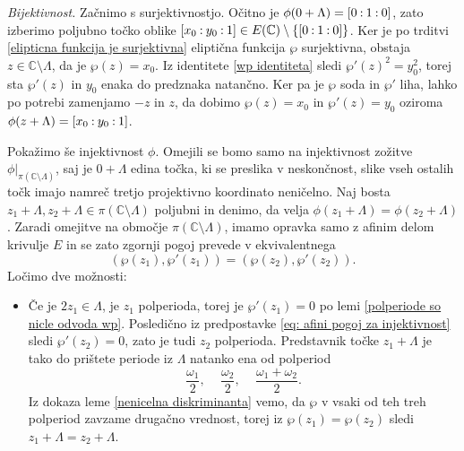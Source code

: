 \documentclass[mat1]{fmfdelo}
\numberwithin{equation}{section}
\newcommand{\C}{\mathbb C}
\newcommand{\oio}{\pcoor{0: 1 : 0}}
\newcommand{\om}{\omega}
\newcommand{\pcoor}[1]{%
\begingroup\lccode`~=`: \lowercase{\endgroup
\edef~}{\mathbin{\mathchar\the\mathcode`:}\nobreak}%
\left[%
\begingroup
\mathcode`:=\string"8000
#1%
\endgroup
\right]%
}
\theoremstyle{definition}
\begin{document}
\begin{dokaz}
    \emph{Bijektivnost.}
    Začnimo s surjektivnostjo. Očitno je $\phi(0 + \Lambda) = \oio$, zato izberimo poljubno točko oblike $\pcoor{x_0 : y_0 : 1} \in E(\C) \setminus \{\oio\}$. Ker je po trditvi \ref{elipticna funkcija je surjektivna} eliptična funkcija $\wp$ surjektivna, obstaja $z \in \C \setminus \Lambda$, da je $\wp(z) = x_0$. Iz identitete \eqref{wp identiteta} sledi $\wp'(z)^2 = y_0^2$, torej sta $\wp'(z)$ in $y_0$ enaka do predznaka natančno. Ker pa je $\wp$ soda in $\wp'$ liha, lahko po potrebi zamenjamo $-z$ in $z$, da dobimo $\wp(z) = x_0$ in $\wp'(z) = y_0$ oziroma $\phi(z + \Lambda) = \pcoor{x_0 : y_0 : 1}$.

    Pokažimo še injektivnost $\phi$. Omejili se bomo samo na injektivnost zožitve $\phi|_{\pi(\C\setminus\Lambda)}$, saj je $0 + \Lambda$ edina točka, ki se preslika v neskončnost, slike vseh ostalih točk imajo namreč tretjo projektivno koordinato neničelno. Naj bosta $z_1 + \Lambda, z_2 + \Lambda \in \pi(\C \setminus \Lambda)$ poljubni in denimo, da velja $\phi(z_1 + \Lambda) = \phi(z_2 + \Lambda)$. Zaradi omejitve na območje $\pi(\C \setminus \Lambda)$, imamo opravka samo z afinim delom krivulje $E$ in se zato zgornji pogoj prevede v ekvivalentnega 
    \begin{equation}
        \label{eq: afini pogoj za injektivnost}
        (\wp(z_1), \wp'(z_1)) = (\wp(z_2), \wp'(z_2)). 
    \end{equation}  
    Ločimo dve možnosti:
    \begin{itemize}
        \item
        Če je $2z_1 \in \Lambda$, je $z_1$ polperioda, torej je $\wp'(z_1) = 0$ po lemi \ref{polperiode so nicle odvoda wp}. Posledično iz predpostavke \eqref{eq: afini pogoj za injektivnost} sledi $\wp'(z_2) = 0$, zato je tudi $z_2$ polperioda. Predstavnik točke $z_1 + \Lambda$ je tako do prištete periode iz $\Lambda$ natanko ena od polperiod
        \[
            \frac{\om_1}{2}\text{, } \quad \frac{\om_2}{2}\text{, } \quad \frac{\om_1 + \om_2}{2}.
        \]
        Iz dokaza leme \ref{nenicelna diskriminanta} vemo, da $\wp$ v vsaki od teh treh polperiod zavzame drugačno vrednost, torej iz $\wp(z_1) = \wp(z_2)$ sledi $z_1 + \Lambda = z_2 + \Lambda$.


\end{itemize}
\end{dokaz}
\end{document}
